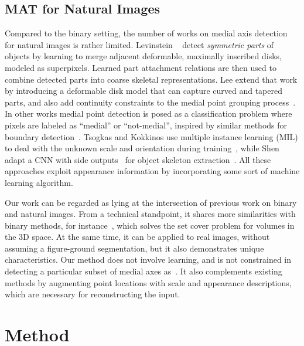 \documentclass[10pt,twocolumn,letterpaper]{article}
\begin{document}
\subsection{MAT for Natural Images}\label{sec:related:natural}
Compared to the binary setting, the number of works on medial axis detection for natural images is rather limited.
Levinstein \etal~\cite{levinshtein2009multiscale} detect \emph{symmetric parts} of objects
by learning to merge adjacent deformable, maximally inscribed disks, modeled as superpixels.
Learned part attachment relations are then used to combine detected parts into coarse skeletal representations.
Lee \etal extend that work by introducing a deformable disk model that can capture curved and tapered parts, and also add
continuity constraints to the medial point grouping process~\cite{lee2013detecting}.
In other works medial point detection is posed as a classification problem where pixels are labeled
as ``medial'' or ``not-medial'', inspired by similar methods for boundary detection~\cite{martin2004learning}.
Tsogkas and Kokkinos use multiple instance learning (MIL) to deal with the unknown scale and orientation 
during training~\cite{tsogkas2012learning}, while Shen \etal adapt a CNN with 
side outputs~\cite{xie2015holistically} for object skeleton extraction~\cite{shen2016object}.
All these approaches exploit appearance information by incorporating some sort of machine learning algorithm.

Our work can be regarded as lying at the intersection of previous work on binary and natural images.
From a technical standpoint, it shares more similarities with binary methods, for instance~\cite{stolpner2012medial},
which solves the set cover problem for volumes in the 3D space.
At the same time, it can be applied to real images, without assuming a figure-ground segmentation,
but it also demonstrates unique characteristics.
Our method does not involve learning, and is not constrained in detecting a particular subset of
medial axes as~\cite{tsogkas2012learning,shen2016object}.
It also complements existing methods by augmenting point locations with scale and appearance descriptions, which
are necessary for reconstructing the input.


\section{Method}\label{sec:method}
\end{document}
